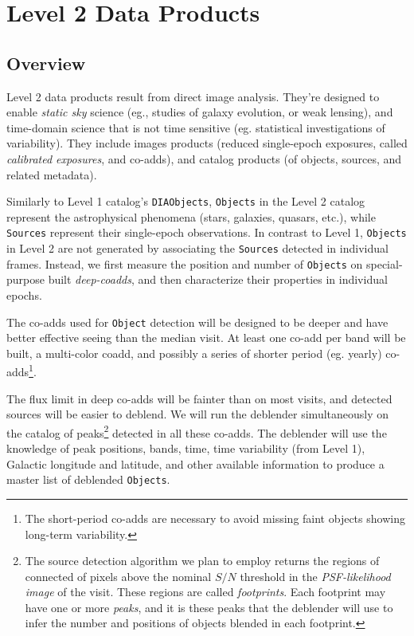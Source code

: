 \documentclass[12pt]{article}
\newcommand{\code}[1]{\texttt{#1}}
\newcommand{\DIAObjects}{\code{DIAObjects}\xspace}
\newcommand{\Object}{\code{Object}\xspace}
\newcommand{\Objects}{\code{Objects}\xspace}
\newcommand{\Sources}{\code{Sources}\xspace}
\begin{document}
\section{Level 2 Data Products}

\subsection{Overview}

Level 2 data products result from direct image analysis. They're designed to
enable {\em static sky} science (eg., studies of galaxy evolution, or weak
lensing), and time-domain science that is not time sensitive (eg. statistical
investigations of variability). They include images products (reduced
single-epoch exposures, called {\em calibrated exposures}, and co-adds), and
catalog products (of objects, sources, and related metadata).

\vspace{1em}

Similarly to Level 1 catalog's \DIAObjects, \Objects in the Level 2 catalog
represent the astrophysical phenomena (stars, galaxies, quasars, etc.), while
\Sources represent their single-epoch observations. In contrast to Level 1,
\Objects in Level 2 are not generated by associating the \Sources detected in
individual frames. Instead, we first measure the position and number of
\Objects on special-purpose built {\em deep-coadds}, and then characterize
their properties in individual epochs.

The co-adds used for \Object detection will be designed to
be deeper and have better effective seeing than the median visit. At 
least one co-add per band will be built, a multi-color coadd, and possibly a
series of shorter period (eg. yearly) co-adds\footnote{The short-period
co-adds are necessary to avoid missing faint objects showing long-term 
variability.}.

The flux limit in deep co-adds will be fainter than on most visits, and
detected sources will be easier to deblend. We will run the deblender
simultaneously on the catalog of peaks\footnote{The source detection algorithm we
plan to employ returns the regions of connected of pixels above the nominal
$S/N$ threshold in the {\em PSF-likelihood image} of the visit. These regions
are called {\em footprints}. Each footprint may have one or more {\em peaks},
and it is these peaks that the deblender will use to infer the number and
positions of objects blended in each footprint.} detected in all these co-adds. 
The deblender will use the knowledge of peak positions, bands, time, time 
variability (from Level 1), Galactic longitude and latitude, and other 
available information to produce a master list of deblended \Objects.
\end{document}
